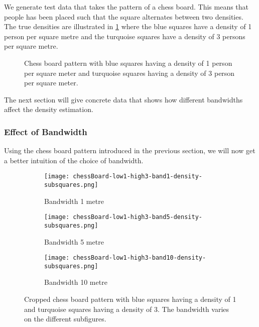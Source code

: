 We generate test data that takes the pattern of a chess board. This means that people has been placed such that the square alternates between two densities. The true densities are illustrated in \cref{fig:chessBoard-low1-high3-band5} where the blue squares have a density of 1 person per square metre and the turquoise squares have a density of 3 persons per square metre.


\begin{figure}[htbp]
\centering
{}
    \caption[Chess board pattern]{Chess board pattern with blue squares having a density of 1 person per square meter and turquoise squares having a density of 3 person per square meter.}
    \label{fig:chessBoard-low1-high3-band5}
\end{figure}

The next section will give concrete data that shows how different bandwidths affect the density estimation.

\subsubsection{Effect of Bandwidth}

Using the chess board pattern introduced in the previous section, we will now get a better intuition of the choice of bandwidth. 

\begin{figure}[htbp]
\centering

\begin{subfigure}[c]{.32\linewidth}
    \centering
    \texttt{[image: chessBoard-low1-high3-band1-density-subsquares.png]}
    \caption{Bandwidth 1 metre}
    \label{fig:chessBoard-low1-high3-band1-cropped}
\end{subfigure}
%
\begin{subfigure}[c]{.32\linewidth}
    \centering
    \texttt{[image: chessBoard-low1-high3-band5-density-subsquares.png]}
    \caption{Bandwidth 5 metre}
    \label{fig:chessBoard-low1-high3-band5-cropped}
\end{subfigure}
%
\begin{subfigure}[c]{.32\linewidth}
    \centering
    \texttt{[image: chessBoard-low1-high3-band10-density-subsquares.png]}
    \caption{Bandwidth 10 metre}
    \label{fig:chessBoard-low1-high3-band10-cropped}
\end{subfigure}
%
\caption[Analysed chess board pattern with different bandwidths]{Cropped chess board pattern with blue squares having a density of 1 and turquoise squares having a density of 3. The bandwidth varies on the different subfigures.}
\label{fig:chessBoard-different-bandwidths}
\end{figure}

